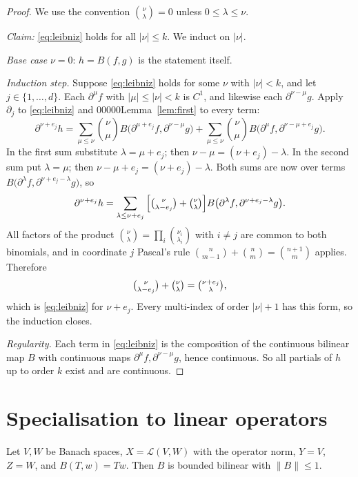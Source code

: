 \begin{proof}
We use the convention $\binom{\nu}{\lambda}=0$ unless $0\le\lambda\le\nu$.

\emph{Claim:} \eqref{eq:leibniz} holds for all $|\nu|\le k$. We induct on $|\nu|$.

\emph{Base case} $\nu=0$: $h=B(f,g)$ is the statement itself.

\emph{Induction step.} Suppose \eqref{eq:leibniz} holds for some $\nu$ with $|\nu|<k$, and let $j\in\{1,\dots,d\}$.
Each $\partial^\mu f$ with $|\mu|\le|\nu|<k$ is $C^1$, and likewise each $\partial^{\nu-\mu}g$. Apply
$\partial_j$ to \eqref{eq:leibniz} and 00000Lemma~\ref{lem:first} to every term:
\[
  \partial^{\nu+e_j}h
  =\sum_{\mu\le\nu}\binom{\nu}{\mu}B\big(\partial^{\mu+e_j}f,\partial^{\nu-\mu}g\big)
  +\sum_{\mu\le\nu}\binom{\nu}{\mu}B\big(\partial^{\mu}f,\partial^{\nu-\mu+e_j}g\big).
\]
In the first sum substitute $\lambda=\mu+e_j$; then $\nu-\mu=(\nu+e_j)-\lambda$. In the second sum put
$\lambda=\mu$; then $\nu-\mu+e_j=(\nu+e_j)-\lambda$. Both sums are now over terms
$B\big(\partial^\lambda f,\partial^{\nu+e_j-\lambda}g\big)$, so
\[
  \partial^{\nu+e_j}h=\sum_{\lambda\le\nu+e_j}
  \Big[\tbinom{\nu}{\lambda-e_j}+\tbinom{\nu}{\lambda}\Big]
  B\big(\partial^\lambda f,\partial^{\nu+e_j-\lambda}g\big).
\]
All factors of the product $\binom{\nu}{\lambda}=\prod_i\binom{\nu_i}{\lambda_i}$ with $i\ne j$ are common to
both binomials, and in coordinate $j$ Pascal's rule
$\binom{n}{m-1}+\binom{n}{m}=\binom{n+1}{m}$ applies. Therefore
\[
  \tbinom{\nu}{\lambda-e_j}+\tbinom{\nu}{\lambda}=\tbinom{\nu+e_j}{\lambda},
\]
which is \eqref{eq:leibniz} for $\nu+e_j$. Every multi-index of order $|\nu|+1$ has this form, so the induction closes.

\emph{Regularity.} Each term in \eqref{eq:leibniz} is the composition of the continuous bilinear map $B$
with continuous maps $\partial^\mu f,\partial^{\nu-\mu}g$, hence continuous.
So all partials of $h$ up to order $k$ exist and are continuous.
\end{proof}

\section*{Specialisation to linear operators}

\begin{lemma}\label{lem:op}
Let $V,W$ be Banach spaces, $X=\mathcal L(V,W)$ with the operator norm, $Y=V$, $Z=W$, and
$B(T,w)=Tw$. Then $B$ is bounded bilinear with $\|B\|\le1$.
\end{lemma}

